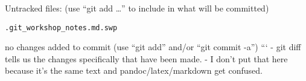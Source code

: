 \documentclass[10pt,]{article}
\begin{document}
Untracked files: (use ``git add \ldots{}'' to include in what will be
committed)

\begin{verbatim}
.git_workshop_notes.md.swp
\end{verbatim}

no changes added to commit (use ``git add'' and/or ``git commit -a'')
``` - git diff tells us the changes specifically that have been made. -
I don't put that here because it's the same text and
pandoc/latex/markdown get confused.

\hypertarget{refs}{}
\end{document}
